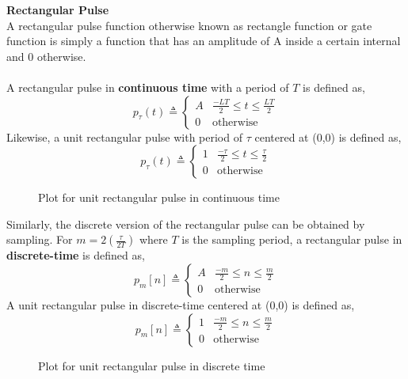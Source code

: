 \documentclass{article}[12 pt]
\begin{document}
\begin{solution}
{
\textbf{Rectangular Pulse}\\
A rectangular pulse function otherwise known as rectangle function or gate function is simply a function that has an amplitude of A inside a certain internal and 0 otherwise.\\\\
A rectangular pulse in \textbf{continuous time} with a period of $T$ is defined as,
\begin{equation*}
p_\tau(t) \triangleq \begin{cases}
  A & \frac{-LT}{2} \leq t \leq \frac{LT}{2}\\
  0 & \text{otherwise}
\end{cases}
\end{equation*}
Likewise, a unit rectangular pulse with period of $\tau$ centered at (0,0) is defined as,
\begin{equation*}
p_\tau(t) \triangleq \begin{cases}
  1 & \frac{-\tau}{2} \leq t \leq \frac{\tau}{2}\\
  0 & \text{otherwise}
\end{cases}
\end{equation*}
\begin{figure}[H]
\centering
\rectContinuous
\caption{Plot for unit rectangular pulse in continuous time}
\label{fig:rectContinuous}
\end{figure}
Similarly, the discrete version of the rectangular pulse can be obtained by sampling. For $m=2\left(\frac{\tau}{2T}\right)$ where $T$ is the sampling period, a rectangular pulse in \textbf{discrete-time} is defined as,
\begin{equation*}
p_m[n] \triangleq \begin{cases}
  A & \frac{-m}{2} \leq n \leq \frac{m}{2}\\
  0 & \text{otherwise}
\end{cases}
\end{equation*}
A unit rectangular pulse in discrete-time centered at (0,0) is defined as,
\begin{equation*}
p_m[n] \triangleq \begin{cases}
  1 & \frac{-m}{2} \leq n \leq \frac{m}{2}\\
  0 & \text{otherwise}
\end{cases}
\end{equation*}
\begin{figure}[H]
\centering
\rectDiscrete
\caption{Plot for unit rectangular pulse in discrete time}

\end{figure}}
\end{solution}
\end{document}
